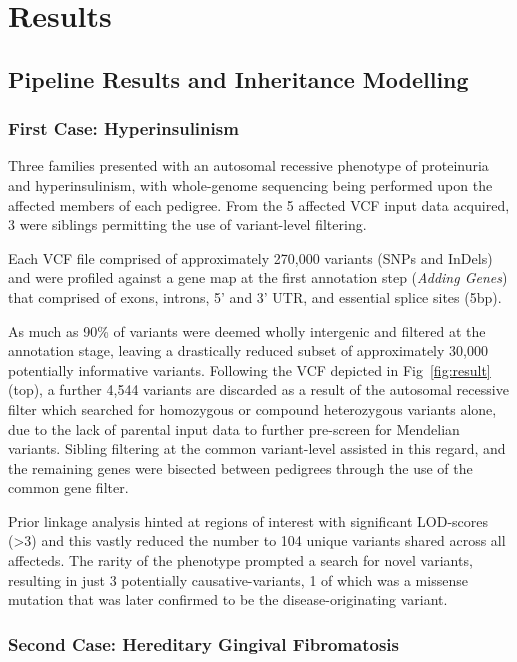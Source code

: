 \section{Results}

\subsection{Pipeline Results and Inheritance Modelling}

\subsubsection{First Case: Hyperinsulinism}

Three families presented with an autosomal recessive phenotype of proteinuria and hyperinsulinism, with whole-genome sequencing being performed upon the affected members of each pedigree. From the 5 affected VCF input data acquired, 3 were siblings permitting the use of variant-level filtering.

Each VCF file comprised of approximately 270,000 variants (SNPs and InDels) and were profiled against a gene map at the first annotation step (\textit{Adding Genes}) that comprised of exons, introns, 5' and 3' UTR, and essential splice sites (5bp).

As much as 90\% of variants were deemed wholly intergenic and filtered at the annotation stage, leaving a drastically reduced subset of approximately 30,000 potentially informative variants. Following the VCF depicted in Fig~\ref{fig:result} (top), a further 4,544 variants are discarded as a result of the autosomal recessive filter which searched for homozygous or compound heterozygous variants alone, due to the lack of parental input data to further pre-screen for Mendelian variants. Sibling filtering at the common variant-level assisted in this regard, and the remaining genes were bisected between pedigrees through the use of the common gene filter.

Prior linkage analysis hinted at regions of interest with significant LOD-scores (>3) and this vastly reduced the number to 104 unique variants shared across all affecteds. The rarity of the phenotype prompted a search for novel variants, resulting in just 3 potentially causative-variants, 1 of which was a missense mutation that was later confirmed to be the disease-originating variant.


\subsubsection{Second Case: Hereditary Gingival Fibromatosis}

